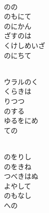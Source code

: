 \documentclass[10pt,b5j]{tarticle} %
\begin{document}
\begin{enumerate}
\begin{minipage}[c]{\blocksize}
    \end{minipage}
    \begin{minipage}[c]{\blocksize}
        
        \vspace{\linespace}
        \item~\\
        のの\\
        のもにて\\
        のにかん\\
        ざすのは\\
        くけしめいざ\\
        のにちて
        
    \end{minipage}
    \begin{minipage}[c]{\blocksize}
        
        \vspace{\linespace}
        \item~\\
        ウラルのく\\
        くらきは\\
        りつつ\\
        のする\\
        ゆるをにめ\\
        ての
        
    \end{minipage}
    \begin{minipage}[c]{\blocksize}
        
        \vspace{\linespace}
        \item~\\
        のをりし\\
        のをきね\\
        つべきはぬ\\
        よやして\\
        のもなし\\
        への
    
    \end{minipage}
\end{enumerate} %
\end{document}
